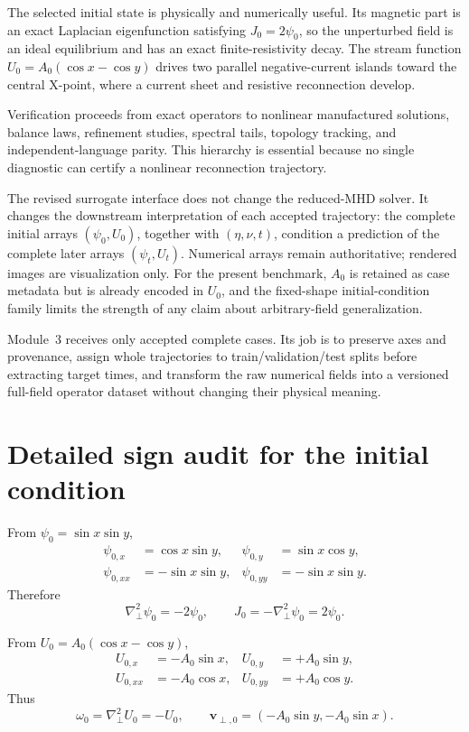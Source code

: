 \documentclass[11pt]{article}
\newcommand{\vect}[1]{\bm{#1}}
\newcommand{\Lap}{\nabla_{\!\perp}^{2}}
\begin{document}
The selected initial state is physically and numerically useful. Its magnetic part is an exact Laplacian eigenfunction satisfying $J_0=2\psi_0$, so the unperturbed field is an ideal equilibrium and has an exact finite-resistivity decay. The stream function $U_0=A_0(\cos x-\cos y)$ drives two parallel negative-current islands toward the central X-point, where a current sheet and resistive reconnection develop.

Verification proceeds from exact operators to nonlinear manufactured solutions, balance laws, refinement studies, spectral tails, topology tracking, and independent-language parity. This hierarchy is essential because no single diagnostic can certify a nonlinear reconnection trajectory.

The revised surrogate interface does not change the reduced-MHD solver. It changes the downstream interpretation of each accepted trajectory: the complete initial arrays $(\psi_0,U_0)$, together with $(\eta,\nu,t)$, condition a prediction of the complete later arrays $(\psi_t,U_t)$. Numerical arrays remain authoritative; rendered images are visualization only. For the present benchmark, $A_0$ is retained as case metadata but is already encoded in $U_0$, and the fixed-shape initial-condition family limits the strength of any claim about arbitrary-field generalization.

Module~3 receives only accepted complete cases. Its job is to preserve axes and provenance, assign whole trajectories to train/validation/test splits before extracting target times, and transform the raw numerical fields into a versioned full-field operator dataset without changing their physical meaning.

\clearpage
\appendix

\section{Detailed sign audit for the initial condition}
\label{app:signs}

From $\psi_0=\sin x\sin y$,
\begin{align}
\psi_{0,x}&=\cos x\sin y,&
\psi_{0,y}&=\sin x\cos y,\\
\psi_{0,xx}&=-\sin x\sin y,&
\psi_{0,yy}&=-\sin x\sin y.
\end{align}
Therefore
\begin{equation}
\Lap\psi_0=-2\psi_0,
\qquad
J_0=-\Lap\psi_0=2\psi_0.
\end{equation}

From $U_0=A_0(\cos x-\cos y)$,
\begin{align}
U_{0,x}&=-A_0\sin x,&
U_{0,y}&=+A_0\sin y,\\
U_{0,xx}&=-A_0\cos x,&
U_{0,yy}&=+A_0\cos y.
\end{align}
Thus
\begin{equation}
\omega_0=\Lap U_0=-U_0,
\qquad
\vect{v}_{\perp,0}
=(-A_0\sin y,-A_0\sin x).
\end{equation}
\end{document}
